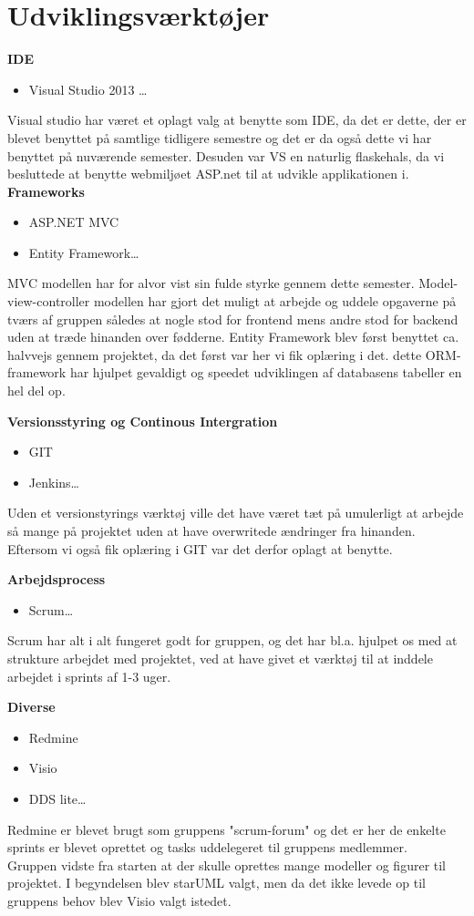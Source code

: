 \section{Udviklingsværktøjer} 


\textbf{IDE}
\begin{itemize}
  \item Visual Studio 2013 \ldots
\end{itemize}
Visual studio har været et oplagt valg at benytte som IDE, da det er dette, der er blevet benyttet på samtlige tidligere semestre og det er da også dette vi har benyttet på nuværende semester. Desuden var VS en naturlig flaskehals, da vi besluttede at benytte webmiljøet ASP.net til at udvikle applikationen i. \\


\textbf{Frameworks} 
\begin{itemize}
  \item ASP.NET MVC
  \item Entity Framework\ldots
\end{itemize}
MVC modellen har for alvor vist sin fulde styrke gennem dette semester. Model-view-controller modellen har gjort det muligt at arbejde og uddele opgaverne på tværs af gruppen således at nogle stod for frontend mens andre stod for backend uden at træde hinanden over fødderne.
Entity Framework blev først benyttet ca. halvvejs gennem projektet, da det først var her vi fik oplæring i det. dette ORM-framework har hjulpet gevaldigt og speedet udviklingen af databasens tabeller en hel del op.  

\textbf{Versionsstyring og Continous Intergration} 
\begin{itemize}
  \item GIT
  \item Jenkins\ldots
\end{itemize}
Uden et versionstyrings værktøj ville det have været tæt på umulerligt at arbejde så mange på projektet uden at have overwritede ændringer fra hinanden. Eftersom vi også fik oplæring i GIT var det derfor oplagt at benytte.


\textbf{Arbejdsprocess} 
\begin{itemize}
  \item Scrum\ldots
\end{itemize}
Scrum har alt i alt fungeret godt for gruppen, og det har bl.a. hjulpet os med at strukture arbejdet med projektet, ved at have givet et værktøj til at inddele arbejdet i sprints af 1-3 uger. 


\textbf{Diverse} 
\begin{itemize}
  \item Redmine
  \item Visio
  \item DDS lite\ldots
\end{itemize}
Redmine er blevet brugt som gruppens "scrum-forum" og det er her de enkelte sprints er blevet oprettet og tasks uddelegeret til gruppens medlemmer. \\
Gruppen vidste fra starten at der skulle oprettes mange modeller og figurer til projektet. I begyndelsen blev starUML valgt, men da det ikke levede op til gruppens behov blev Visio valgt istedet.
